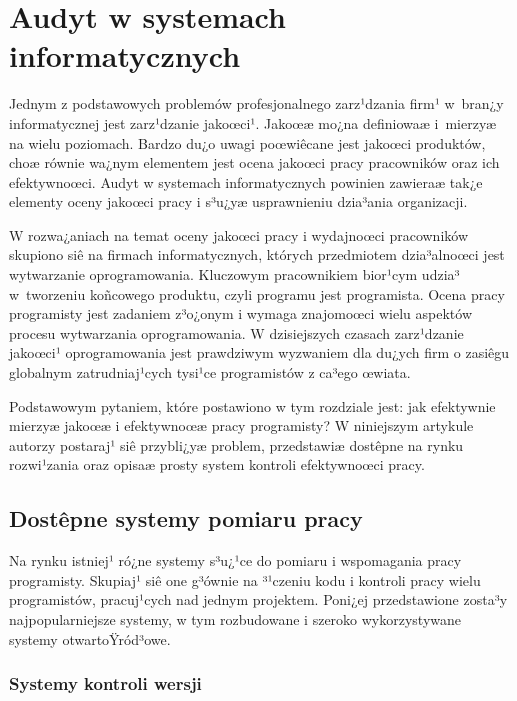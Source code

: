 
\renewcommand{\autorzy}{M.~Nowak, G.~Maj}
\chapter[Audyt w systemach informatycznych][Audyt w systemach informatycznych]{Audyt w systemach informatycznych}

  Jednym z podstawowych problemów profesjonalnego zarz¹dzania firm¹ w~bran¿y informatycznej jest zarz¹dzanie jakoœci¹. Jakoœæ mo¿na definiowaæ i~mierzyæ na wielu poziomach. Bardzo du¿o uwagi poœwiêcane jest jakoœci produktów, choæ równie wa¿nym elementem jest ocena jakoœci pracy pracowników oraz ich efektywnoœci. Audyt w systemach informatycznych powinien zawieraæ tak¿e elementy oceny jakoœci pracy i s³u¿yæ usprawnieniu dzia³ania organizacji.

W rozwa¿aniach na temat oceny jakoœci pracy i wydajnoœci pracowników skupiono siê na firmach informatycznych, których przedmiotem dzia³alnoœci jest wytwarzanie oprogramowania. Kluczowym pracownikiem bior¹cym udzia³ w~tworzeniu koñcowego produktu, czyli programu jest programista. Ocena pracy programisty jest zadaniem z³o¿onym i wymaga znajomoœci wielu aspektów procesu wytwarzania oprogramowania. W dzisiejszych czasach zarz¹dzanie jakoœci¹ oprogramowania jest prawdziwym wyzwaniem dla du¿ych firm o zasiêgu globalnym zatrudniaj¹cych tysi¹ce programistów z ca³ego œwiata.

Podstawowym pytaniem, które postawiono w tym rozdziale jest: jak efektywnie mierzyæ jakoœæ i efektywnoœæ pracy programisty? W niniejszym artykule autorzy postaraj¹ siê przybli¿yæ problem, przedstawiæ dostêpne na rynku rozwi¹zania oraz opisaæ prosty system kontroli efektywnoœci pracy.


\section{Dostêpne systemy pomiaru pracy}
\label{sec:dostepneSystemy}

Na rynku istniej¹ ró¿ne systemy s³u¿¹ce do pomiaru i wspomagania pracy programisty. Skupiaj¹ siê one
g³ównie na ³¹czeniu kodu i kontroli pracy wielu programistów, pracuj¹cych nad jednym projektem. Poni¿ej przedstawione zosta³y najpopularniejsze systemy, w tym rozbudowane i szeroko wykorzystywane systemy otwartoŸród³owe.

\subsection{Systemy kontroli wersji}

